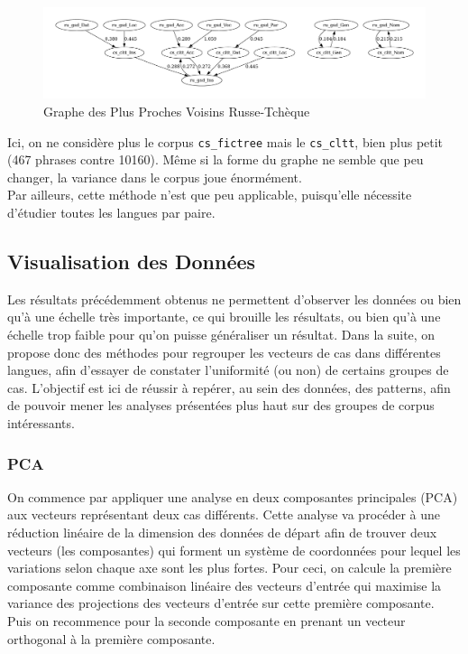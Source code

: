 \documentclass{cours}
\begin{document}
\begin{figure}[H]
	\centering
	\includegraphics[width=\textwidth]{Figures/GNN/gnn_ru_gsd_cs_cltt}
	\caption{Graphe des Plus Proches Voisins Russe-Tchèque}
	\label{GNNRuCz}
\end{figure}

Ici, on ne considère plus le corpus \texttt{cs\_fictree} mais le \texttt{cs\_cltt}, bien plus petit (467 phrases contre 10160).
Même si la forme du graphe ne semble que peu changer, la variance dans le corpus joue énormément.\\
Par ailleurs, cette méthode n'est que peu applicable, puisqu'elle nécessite d'étudier toutes les langues par paire.

\subsection{Visualisation des Données}\label{subsec:vis}
Les résultats précédemment obtenus ne permettent d'observer les données ou bien qu'à une échelle très importante, ce qui brouille les résultats, ou bien qu'à une échelle trop faible pour qu'on puisse généraliser un résultat.
Dans la suite, on propose donc des méthodes pour regrouper les vecteurs de cas dans différentes langues, afin d'essayer de constater l'uniformité (ou non) de certains groupes de cas.
L'objectif est ici de réussir à repérer, au sein des données, des patterns, afin de pouvoir mener les analyses présentées plus haut sur des groupes de corpus intéressants.


\subsubsection{PCA}\label{subsub:pca}
On commence par appliquer une analyse en deux composantes principales (PCA) aux vecteurs représentant deux cas différents.
Cette analyse va procéder à une réduction linéaire de la dimension des données de départ afin de trouver deux vecteurs (les composantes) qui forment un système de coordonnées pour lequel les variations selon chaque axe sont les plus fortes.
Pour ceci, on calcule la première composante comme combinaison linéaire des vecteurs d'entrée qui maximise la variance des projections des vecteurs d'entrée sur cette première composante. Puis on recommence pour la seconde composante en prenant un vecteur orthogonal à la première composante.
\end{document}
